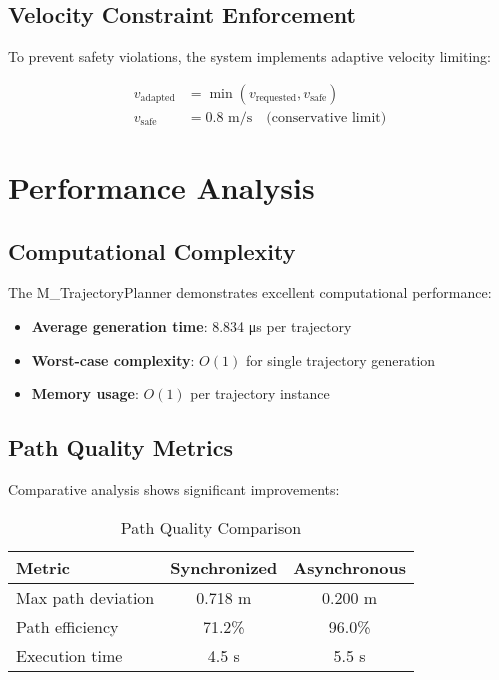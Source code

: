 \documentclass[12pt,a4paper]{article}
\begin{document}
\subsection{Velocity Constraint Enforcement}

To prevent safety violations, the system implements adaptive velocity limiting:

\begin{align}
v_{\text{adapted}} &= \min(v_{\text{requested}}, v_{\text{safe}}) \\
v_{\text{safe}} &= 0.8 \text{ m/s} \quad \text{(conservative limit)}
\end{align}

\section{Performance Analysis}

\subsection{Computational Complexity}

The M\_TrajectoryPlanner demonstrates excellent computational performance:

\begin{itemize}
\item \textbf{Average generation time}: 8.834 μs per trajectory
\item \textbf{Worst-case complexity}: $O(1)$ for single trajectory generation
\item \textbf{Memory usage}: $O(1)$ per trajectory instance
\end{itemize}

\subsection{Path Quality Metrics}

Comparative analysis shows significant improvements:

\begin{table}[h]
\centering
\begin{tabular}{|l|c|c|}
\hline
\textbf{Metric} & \textbf{Synchronized} & \textbf{Asynchronous} \\
\hline
Max path deviation & 0.718 m & 0.200 m \\
Path efficiency & 71.2\% & 96.0\% \\
Execution time & 4.5 s & 5.5 s \\
\hline
\end{tabular}
\caption{Path Quality Comparison}
\end{table}
\end{document}
